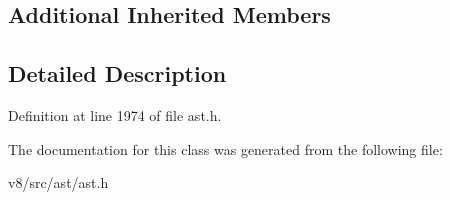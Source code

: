 \subsection*{Additional Inherited Members}


\subsection{Detailed Description}


Definition at line 1974 of file ast.\+h.



The documentation for this class was generated from the following file\+:\begin{DoxyCompactItemize}
\item 
v8/src/ast/ast.\+h\end{DoxyCompactItemize}
